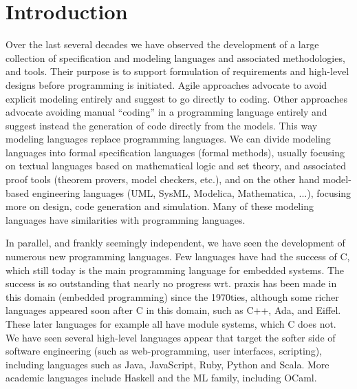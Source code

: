 
\section{Introduction}
\label{sec:introduction}

Over the last several decades we have observed the development of a 
large collection of specification and modeling languages and 
associated methodologies, and tools. Their purpose is to 
support formulation of requirements and high-level designs before 
programming is initiated. Agile approaches advocate to avoid 
explicit modeling entirely and suggest to go directly to coding. 
Other approaches advocate avoiding manual ``coding'' in a 
programming 
language entirely and suggest instead the generation of code 
directly from the models. This way modeling languages replace 
programming languages.  We can divide modeling languages into 
formal specification languages (formal methods), usually focusing 
on textual languages based on mathematical logic and set theory, 
and associated proof tools (theorem provers, model checkers, etc.), 
and on the other hand model-based engineering languages (UML, 
SysML, Modelica, Mathematica, ...), focusing more on design, code 
generation and simulation. Many of these modeling languages have 
similarities with programming languages.

In parallel, and frankly seemingly independent, we have seen the 
development of numerous new programming languages. Few languages 
have had the success of C, which still today is the main 
programming language for embedded systems. The success is so 
outstanding that nearly no progress wrt. praxis has been made in 
this domain (embedded programming) since the 1970ties, although 
some richer languages appeared soon after C in this domain, such as 
C++, Ada, and Eiffel. These later languages for example
all have module systems, which C does not. We have seen several high-level languages appear that target the softer side of software 
engineering (such as web-programming, user interfaces, scripting), 
including languages such as Java, JavaScript, Ruby, Python and 
Scala.  More academic languages include Haskell and the ML family, 
including OCaml.

